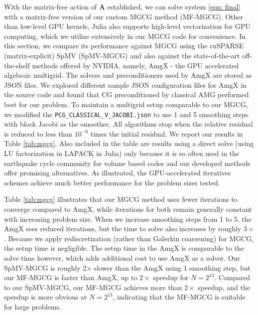 With the matrix-free action of $\boldsymbol{A}$ established, we can solve system \eqref{eqn: final} with a matrix-free version of our custom MGCG method (MF-MGCG). 
Other than low-level GPU kernels, Julia also supports high-level vectorization for GPU computing, which we utilize extensively in our MGCG code for convenience.
In this section, we compare its performance against MGCG using the cuSPARSE (matrix-explicit) SpMV (SpMV-MGCG) and also against the state-of-the-art off-the-shelf methods offered by NVIDIA, namely, AmgX - the GPU accelerated algebraic multigrid. The solvers and preconditioners used by AmgX are stored as JSON files. 
We explored different sample JSON configuration files for AmgX in the source code and found that CG preconditioned by classical AMG performed best for our problem. 
To maintain a multigrid setup comparable to our MGCG, we modified the \texttt{PCG\_CLASSICAL\_V\_JACOBI.json} to use 1 and 5 smoothing steps with block Jacobi as the smoother.
All algorithms stop when the relative residual is reduced to less than $10^{-6}$ times the initial residual.
We report our results in Table \ref{tab:mgcg}. Also included in the table are results using a direct solve (using LU factorization in LAPACK in Julia) only because it is so often used in the earthquake cycle community for volume based codes \cite{erickson2020community} and our developed methods offer promising alternatives. As illustrated, the GPU-accelerated iteratives schemes achieve much better performance for the problem sizes tested.

Table \ref{tab:mgcg} illustrates that our MGCG method uses fewer iterations to converge compared to AmgX, while iterations for both remain generally constant with increasing problem size. When we increase smoothing steps from 1 to 5, the AmgX sees reduced iterations, but the time to solve also increases by roughly $3\times$.
Because we apply rediscretization (rather than Galerkin coarsening) for MGCG, the setup time is negligible.
The setup time in the AmgX is comparable to the solve time however, which adds additional cost to use AmgX as a solver.
Our SpMV-MGCG is roughly 2$\times$ slower than the AmgX using 1 smoothing step, but our MF-MGCG is faster than AmgX, up to $2\times$ speedup for $N = 2^{13}$.
Compared to our SpMV-MGCG, our MF-MGCG achieves more than $2\times$ speedup, and the speedup is more obvious at $N=2^{13}$, indicating that the MF-MGCG is suitable for large problems.


